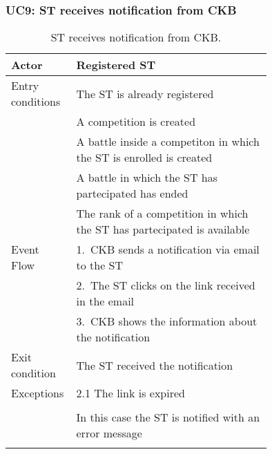 \subsubsection*{UC9: ST receives notification from CKB}
\begin{center}
  \begin{longtable}{l|p{0.75\linewidth}}
    \hline
    Actor & Registered ST \\
    \hline
    Entry conditions & The ST is already registered  \\
    & A competition is created \\
    & A battle inside a competiton in which the ST is enrolled is created \\
    & A battle in which the ST has partecipated has ended \\
    & The rank of a competition in which the ST has partecipated is available \\
    \hline
    Event Flow & 1.\ CKB sends a notification via email to the ST \\
    & 2.\ The ST clicks on the link received in the email \\
    & 3.\ CKB shows the information about the notification \\
    \hline
    Exit condition &  The ST received the notification \\
    \hline
    Exceptions & 2.1 The link is expired \\ \\
    & In this case the ST is notified with an error message \\
    \hline
    \caption{ST receives notification from CKB.}
    \label{tab: ST_receive_notification}
  \end{longtable}
\end{center}

